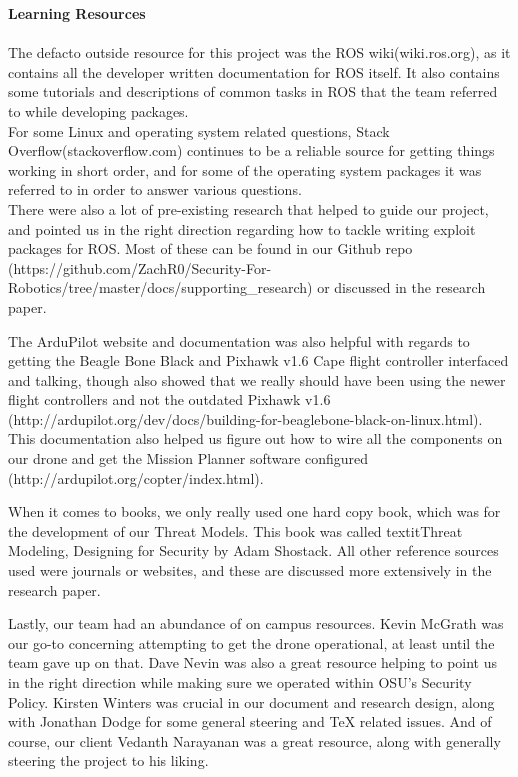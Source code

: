 \documentclass[IEEEtran,letterpaper,10pt,notitlepage,draftclsnofoot,onecolumn]{article}
\begin{document}
\LARGE\textbf{Learning Resources\\ \\}\normalsize
The defacto outside resource for this project was the ROS wiki\cite{ROSWIKI}(wiki.ros.org), as it
contains all the developer written documentation for ROS itself. It also
contains some tutorials and descriptions of common tasks in ROS that the
team referred to while developing packages.\\
For some Linux and operating system related questions, Stack Overflow\cite{SO}(stackoverflow.com)
continues to be a reliable source for getting things working in short order, and
for some of the operating system packages it was referred to in order to answer
various questions.\\
There were also a lot of pre-existing research that helped to guide our project, and pointed us in the right
direction regarding how to tackle writing exploit packages for ROS. Most of these can be found in our Github
repo \cite{GitRepoSupporting}(https://github.com/ZachR0/Security-For-Robotics/tree/master/docs/supporting\_research) or discussed in the research paper.

The ArduPilot website and documentation was also helpful with regards to getting the Beagle Bone Black and
Pixhawk v1.6 Cape flight controller interfaced and talking, though also showed that we really should have been
using the newer flight controllers and not the outdated Pixhawk v1.6 \cite{ArduProjectDevDocs}(http://ardupilot.org/dev/docs/building-for-beaglebone-black-on-linux.html). This
documentation also helped us figure out how to wire all the components on our drone and get the Mission Planner software configured \cite{ArduProjectDocs}(http://ardupilot.org/copter/index.html).

When it comes to books, we only really used one hard copy book, which was for the development of our Threat Models.
This book was called textit{Threat Modeling, Designing for Security} by Adam Shostack. \cite{TMDS}
All other reference sources used were journals or websites, and these are discussed more extensively in the research paper.

Lastly, our team had an abundance of on campus resources. Kevin McGrath was our go-to
concerning attempting to get the drone operational, at least until the team gave up on
that. Dave Nevin was also a great resource helping to point us in the right direction while making sure
we operated within OSU's Security Policy.
Kirsten Winters was crucial in our document and research design, along with Jonathan
Dodge for some general steering and TeX related issues. And of course, our client Vedanth
Narayanan was a great resource, along with generally steering the project to his liking.



\end{document}
